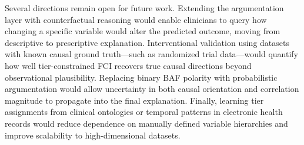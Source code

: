 \documentclass[conference, a4paper]{IEEEtran}
\begin{document}
Several directions remain open for future work. Extending the argumentation layer with counterfactual reasoning would enable clinicians to query how changing a specific variable would alter the predicted outcome, moving from descriptive to prescriptive explanation. Interventional validation using datasets with known causal ground truth—such as randomized trial data—would quantify how well tier-constrained FCI recovers true causal directions beyond observational plausibility. Replacing binary BAF polarity with probabilistic argumentation would allow uncertainty in both causal orientation and correlation magnitude to propagate into the final explanation. Finally, learning tier assignments from clinical ontologies or temporal patterns in electronic health records would reduce dependence on manually defined variable hierarchies and improve scalability to high-dimensional datasets.
\end{document}
